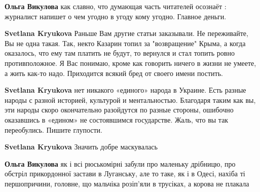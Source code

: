 \begin{itemize}
\begin{itemize}
\textbf{Ольга Викулова} как славно, что думающая часть читателей осознаёт : журналист напишет о чем угодно в угоду кому угодно. Главное деньги.

 
\textbf{Svetlana Kryukova} Раньше Вам другие статьи заказывали. Не переживайте, Вы не одна такая. Так, некто Казарин топил за "возвращение" Крыма, а когда оказалось, что ему там платить не будут, то вернулся и стал топить ровно противположное. Я Вас понимаю, кроме как говорить ничего в жизни не умеете, а жить как-то надо. Приходится всякий бред от своего имени постить.

 
\textbf{Svetlana Kryukova} нет никакого «единого» народа в Украине. Есть разные народы с разной историей, культурой и ментальностью. Благодаря таким как вы, эти народы скоро окончательно разойдутся по разные стороны, ошибочно оказавшись в «едином» не состоявшимся государстве. Жаль, что вы так переобулись. Пишите глупости.

 
\textbf{Svetlana Kryukova} Значить добре маскувалась🤣

 
\textbf{Ольга Викулова} як і всі рюськомірні забули про маленьку дрібницю, про обстріл прикордонної застави в Луганську, але то таке, як і в Одесі, нахіба ті першопричини, головне, що мальчіка розіп'яли в трусіках, а корова не плакала

 

\end{itemize}
\end{itemize}
